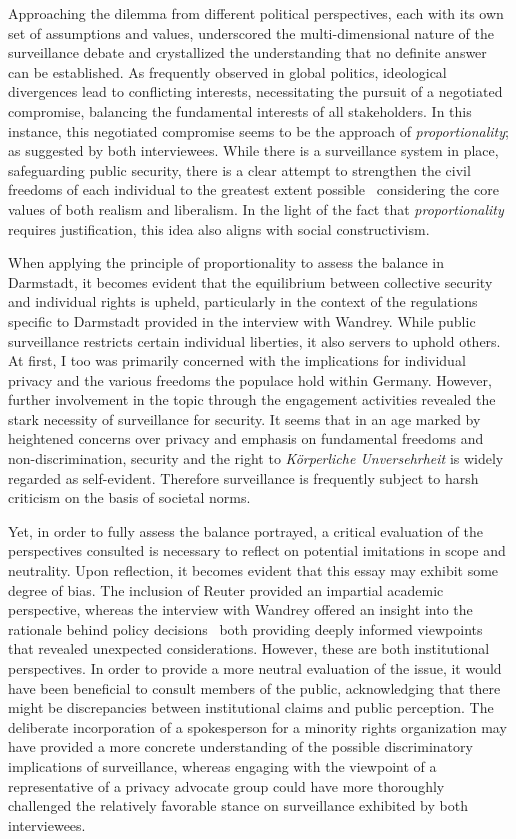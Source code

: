 \documentclass[12pt]{article}
\begin{document}
	Approaching the dilemma from different political perspectives, each with its own set of assumptions and values, underscored the multi-dimensional nature of the surveillance debate and crystallized the understanding that no definite answer can be established. As frequently observed in global politics, ideological divergences lead to conflicting interests, necessitating the pursuit of a negotiated compromise, balancing the fundamental interests of all stakeholders. In this instance, this negotiated compromise seems to be the approach of \textit{proportionality}; as suggested by both interviewees. While there is a surveillance system in place, safeguarding public security, there is a clear attempt to strengthen the civil freedoms of each individual to the greatest extent possible \textemdash\ considering the core values of both realism and liberalism. In the light of the fact that \textit{proportionality} requires justification, this idea also aligns with social constructivism. 
	
	When applying the principle of proportionality to assess the balance in Darmstadt, it becomes evident that the equilibrium between collective security and individual rights is upheld, particularly in the context of the regulations specific to Darmstadt provided in the interview with Wandrey. While public surveillance restricts certain individual liberties, it also servers to uphold others. At first, I too was primarily concerned with the implications for individual privacy and the various freedoms the populace hold within Germany. However, further involvement in the topic through the engagement activities revealed the stark necessity of surveillance for security. It seems that in an age marked by heightened concerns over privacy and emphasis on fundamental freedoms and non-discrimination, security and the right to \textit{Körperliche Unversehrheit} is widely regarded as self-evident. Therefore surveillance is frequently subject to harsh criticism on the basis of societal norms. 
	
	Yet, in order to fully assess the balance portrayed, a critical evaluation of the perspectives consulted is necessary to reflect on potential imitations in scope and neutrality. Upon reflection, it becomes evident that this essay may exhibit some degree of bias. The inclusion of Reuter provided an impartial academic perspective, whereas the interview with Wandrey offered an insight into the rationale behind policy decisions \textemdash\ both providing deeply informed viewpoints that revealed unexpected considerations. However, these are both institutional perspectives. In order to provide a more neutral evaluation of the issue, it would have been beneficial to consult members of the public, acknowledging that there might be discrepancies between institutional claims and public perception. The deliberate incorporation of a spokesperson for a minority rights organization may have provided a more concrete understanding of the possible discriminatory implications of surveillance, whereas engaging with the viewpoint of a representative of a privacy advocate group could have more thoroughly challenged the relatively favorable stance on surveillance exhibited by both interviewees. 
	
\end{document}
